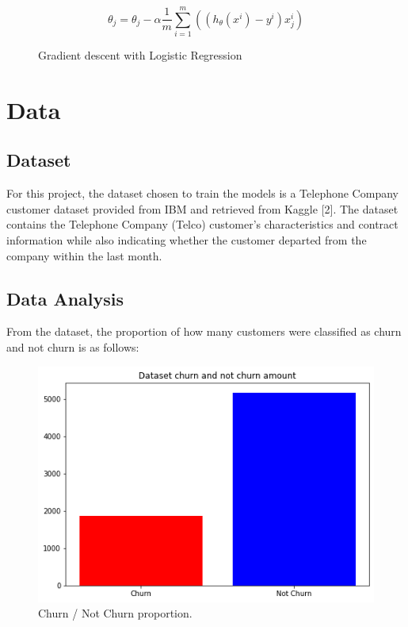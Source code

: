 \documentclass[letterpaper, 10 pt, conference]{ieeeconf}
\begin{document}
\begin{figure}[thpb]
    \centering
    \begin{equation}
        \theta_j = \theta_j - \alpha\frac{1}{m}\sum_{i = 1}^{m}((h_\theta(x^i) - y^i)x^i_j)
    \end{equation}
    \caption{Gradient descent with Logistic Regression}
    \label{gd_formula}
 \end{figure}

\section{ Data }
\subsection{ Dataset }
For this project, the dataset chosen to train the models is a Telephone Company customer dataset provided from IBM and retrieved from Kaggle [2].
The dataset contains the Telephone Company (Telco) customer's characteristics and contract information while also indicating whether the customer departed from the company within the last month.

\subsection{ Data Analysis}

From the dataset, the proportion of how many customers were classified as churn and not churn is as follows:

\begin{figure}[thpb]
    \centering
    \includegraphics[scale=0.3]{figures/churn_propotion.png}
    \caption{Churn / Not Churn proportion.}
    \label{churnProportion}
 \end{figure}
\end{document}
